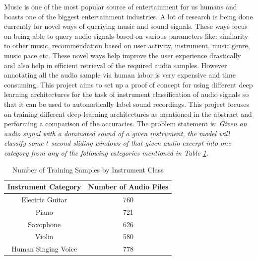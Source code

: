 \documentclass[letterpaper, 12 pt, conference]{ieeeconf}  %
\begin{document}



Music is one of the most popular source of entertainment for us humans and boasts one of the biggest entertainment industries. A lot of research is being done currently for novel ways of queriying music and sound signals. These ways focus on being able to query audio signals based on various parameters like: similarity to other music, recommendation based on user activity, instrument, music genre, music pace etc. These novel ways help improve the user experience drastically and also help in efficient retrieval of the required audio samples. However annotating all the audio sample via human labor is very expensive and time consuming. This project aims to set up a proof of concept for using different deep learning architectures for the task of instrument classification of audio signals so that it can be used to automatically label sound recordings. This project focuses on training different deep learning architectures as mentioned in the abstract and performing a comparison of the accuracies. The problem statement is: \textit{Given an audio signal with a dominated sound of a given instrument, the model will classify some $t$ second sliding windows of that given audio excerpt into one category from any of the following categories mentioned in Table \ref{tab:pd}.}

\begin{table}[!h]
\centering
\caption{Number of Training Samples by Instrument Class}
\begin{tabular}{| c || c |} %
\hline %
 Instrument Category &  Number of Audio Files \\
   \hline \hline
\hline
Electric Guitar &  760 \\
\hline
Piano  &   721 \\
\hline
Saxophone  &   626 \\
\hline
Violin &   580 \\
\hline
Human Singing Voice  &   778 \\
\hline
   \end{tabular}
\label{tab:pd} 
\end{table}
\end{document}
